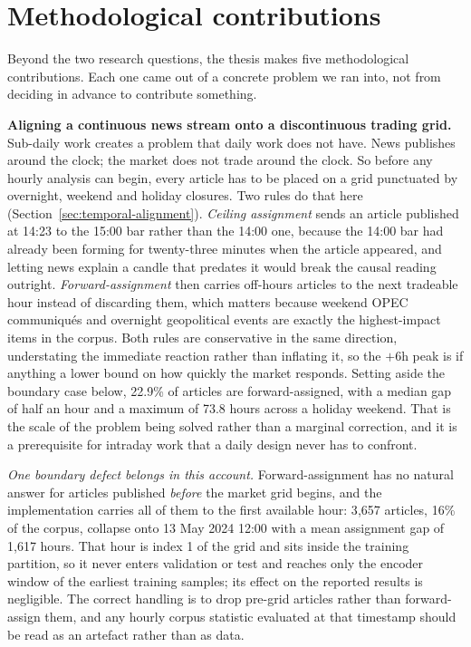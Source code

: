 \section{Methodological contributions}\label{sec:methodological-contributions}

Beyond the two research questions, the thesis makes five methodological contributions. Each one came out of a concrete problem we ran into, not from deciding in advance to contribute something.

\textbf{Aligning a continuous news stream onto a discontinuous trading grid.} Sub-daily work creates a problem that daily work does not have. News publishes around the clock; the market does not trade around the clock. So before any hourly analysis can begin, every article has to be placed on a grid punctuated by overnight, weekend and holiday closures. Two rules do that here (Section~\ref{sec:temporal-alignment}). \emph{Ceiling assignment} sends an article published at 14:23 to the 15:00 bar rather than the 14:00 one, because the 14:00 bar had already been forming for twenty-three minutes when the article appeared, and letting news explain a candle that predates it would break the causal reading outright. \emph{Forward-assignment} then carries off-hours articles to the next tradeable hour instead of discarding them, which matters because weekend OPEC communiqu\'es and overnight geopolitical events are exactly the highest-impact items in the corpus. Both rules are conservative in the same direction, understating the immediate reaction rather than inflating it, so the $+6$h peak is if anything a lower bound on how quickly the market responds. Setting aside the boundary case below, 22.9\% of articles are forward-assigned, with a median gap of half an hour and a maximum of 73.8 hours across a holiday weekend. That is the scale of the problem being solved rather than a marginal correction, and it is a prerequisite for intraday work that a daily design never has to confront.

\emph{One boundary defect belongs in this account.} Forward-assignment has no natural answer for articles published \emph{before} the market grid begins, and the implementation carries all of them to the first available hour: 3{,}657 articles, 16\% of the corpus, collapse onto 13 May 2024 12:00 with a mean assignment gap of 1{,}617 hours. That hour is index 1 of the grid and sits inside the training partition, so it never enters validation or test and reaches only the encoder window of the earliest training samples; its effect on the reported results is negligible. The correct handling is to drop pre-grid articles rather than forward-assign them, and any hourly corpus statistic evaluated at that timestamp should be read as an artefact rather than as data.


